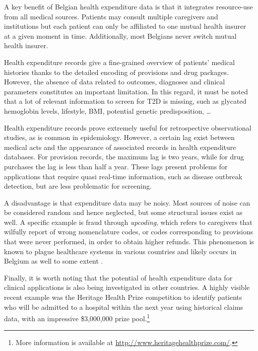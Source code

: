 A key benefit of Belgian health expenditure data is that it integrates resource-use from all medical sources. Patients may consult multiple caregivers and institutions but each patient can only be affiliated to one mutual health insurer at a given moment in time. Additionally, most Belgians never switch mutual health insurer.

Health expenditure records give a fine-grained overview of patients' medical histories thanks to the detailed encoding of provisions and drug packages. However, the absence of data related to outcomes, diagnoses and clinical parameters constitutes an important limitation. In this regard, it must be noted that a lot of relevant information to screen for T2D is missing, such as glycated hemoglobin levels, lifestyle, BMI, potential genetic predisposition, \ldots

Health expenditure records prove extremely useful for retrospective observational studies, as is common in epidemiology. However, a certain lag exist between medical acts  and the appearance of associated records in health expenditure databases. For provision records, the maximum lag is two years, while for drug purchases the lag is less than half a year. These lags present problems for applications that require quasi real-time information, such as disease outbreak detection, but are less problematic for screening.

A disadvantage is that expenditure data may be noisy. Most sources of noise can be considered random and hence neglected, but some structural issues exist as well. A specific example is fraud through \emph{upcoding}, which refers to caregivers that wilfully report of wrong nomenclature codes, or codes corresponding to provisions that were never performed, in order to obtain higher refunds. This phenomenon is known to plague healthcare systems in various countries and likely occurs in Belgium as well to some extent \citep{silverman2004medicare,steinbusch2007risk,berta2010effects}.

Finally, it is worth noting that the potential of health expenditure data for clinical applications is also being investigated in other countries. A highly visible recent example was the Heritage Health Prize competition to identify patients who will be admitted to a hospital within the next year using historical claims data, with an impressive \$3,000,000 prize pool.\footnote{More information is available at \url{http://www.heritagehealthprize.com/}.}
